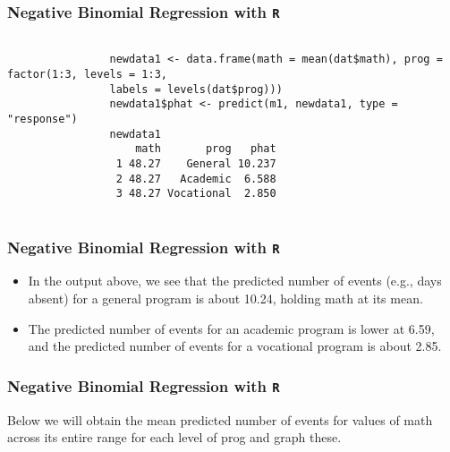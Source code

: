 \documentclass[00-GLMregslides.tex]{subfiles}
\begin{document}
	\begin{frame}[fragile]
		\frametitle{Negative Binomial Regression with \texttt{R} }
		\Large
		
		\begin{framed}
			\begin{verbatim}
			
				newdata1 <- data.frame(math = mean(dat$math), prog = factor(1:3, levels = 1:3, 
				labels = levels(dat$prog)))
				newdata1$phat <- predict(m1, newdata1, type = "response")
				newdata1
				    math       prog   phat
				 1 48.27    General 10.237
				 2 48.27   Academic  6.588
				 3 48.27 Vocational  2.850
			
			\end{verbatim}	
		\end{framed}
		
		
	\end{frame}
\begin{frame}[fragile]
	\frametitle{Negative Binomial Regression with \texttt{R} }
	\Large
	
\begin{itemize}
\item In the output above, we see that the predicted number of events (e.g., days absent) for a general program is about 
10.24, holding math at its mean. 
\item The predicted number of events for an academic program is lower at 6.59, and the predicted number of events for a vocational program is about 2.85.
\end{itemize}
\end{frame}
	\begin{frame}[fragile]
		\frametitle{Negative Binomial Regression with \texttt{R} }
		\Large	
	Below we will obtain the mean predicted number of events for values of math across its entire range for each level of prog and graph these.
	\end{frame}
\end{document}
